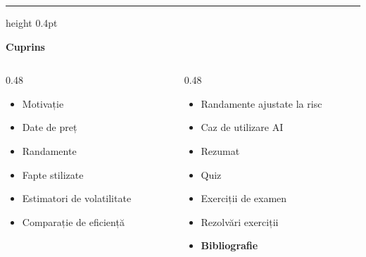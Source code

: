 \documentclass[9pt, aspectratio=169, t]{beamer}
\theoremstyle{definition}
\begin{document}
{
\begin{frame}{}
    {\color{FooterGray}\hrule height 0.4pt}
    \vspace{0.1cm}
    {\Large\textcolor{IDAred}{\textbf{Cuprins}}}
    \vspace{0.2cm}
    {\small
    \begin{columns}[T]
        \begin{column}{0.48\textwidth}
            \begin{itemize}
                \item Motivație \checkmark
                \item Date de preț \checkmark
                \item Randamente \checkmark
                \item Fapte stilizate \checkmark
                \item Estimatori de volatilitate \checkmark
                \item Comparație de eficiență \checkmark
            \end{itemize}
        \end{column}
        \begin{column}{0.48\textwidth}
            \begin{itemize}
                \item Randamente ajustate la risc \checkmark
                \item Caz de utilizare AI \checkmark
                \item Rezumat \checkmark
                \item Quiz \checkmark
                \item Exerciții de examen \checkmark
                \item Rezolvări exerciții \checkmark
                \item \textbf{Bibliografie}
            \end{itemize}
        \end{column}
    \end{columns}
    }
\end{frame}
}

\end{document}
